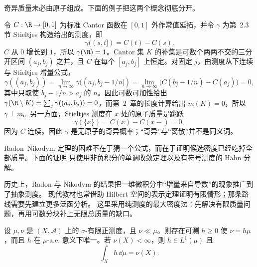 奇异质量未必由原子组成。下面的例子把这两个概念彻底分开。

\begin{example}[Cantor 测度]\label{ex:3-3-1-2}
令 $C:\R\to[0,1]$ 为标准 Cantor 函数在 $[0,1]$ 外作常值延拓，并令 $\gamma$ 为第~2.3 节
Stieltjes 构造给出的测度，即
\[
  \gamma((s,t])=C(t)-C(s).
\]
$C$ 从 $0$ 增长到 $1$，所以 $\gamma(\R)=1$。Cantor 集 $K$ 的补集是可数个两两不交的三分
开区间 $(a_j,b_j)$ 之并，且 $C$ 在每个 $[a_j,b_j]$ 上恒定。对固定 $j$，由测度从下连续与
Stieltjes 增量公式，
\[
 \gamma((a_j,b_j))
 =\lim_{n\to\infty}\gamma((a_j,b_j-1/n])
 =\lim_{n\to\infty}\bigl(C(b_j-1/n)-C(a_j)\bigr)=0,
\]
其中只取使 $b_j-1/n>a_j$ 的 $n$。因此可数可加性给出
$\gamma(\R\setminus K)=\sum_j\gamma((a_j,b_j))=0$，而第~2~章的长度计算给出
$m(K)=0$，所以 $\gamma\perp m$。另一方面，Stieltjes 测度在 $x$ 处的原子质量是跳跃
\[
  \gamma(\{x\})=C(x)-C(x-)=0,
\]
因为 $C$ 连续。因此 $\gamma$ 是无原子的奇异概率；“奇异”与“离散”并不是同义词。
\end{example}

Radon--Nikodym 定理的困难不在于猜一个公式，而在于证明候选密度已经吃掉全部质量。下面的证明
只使用非负积分的单调收敛定理以及有符号测度的 Hahn 分解。

历史上，Radon 与 Nikodym 的结果把一维微积分中“增量来自导数”的现象推广到了抽象测度。
现代教材也常借助 Hilbert 空间的表示定理证明有限情形；那条路线需要先建立更多泛函分析。
这里采用纯测度的最大密度法：先解决有限质量问题，再用可数分块补上无限总质量的缺口。

\begin{theorem}\label{theorem:3-3-1-1}
设 $\mu,\nu$ 是 $(X,\mathcal A)$ 上的 $\sigma$-有限正测度，且 $\nu\ll\mu$。则存在可测
$h\ge0$ 使 $\nu=h\mu$，而且 $h$ 在 $\mu$-a.e. 意义下唯一。若 $\nu(X)<\infty$，则
$h\in L^1(\mu)$ 且
\[
  \int_Xh\,\dd\mu=\nu(X).
\]
\end{theorem}

